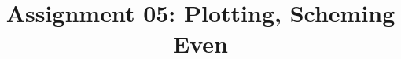 \documentclass{article}
\title{Assignment 05: Plotting, Scheming Even}
\begin{document}
\renderTitle
\end{document}
